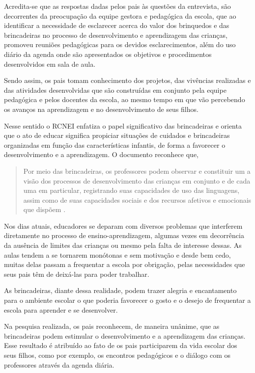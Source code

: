 \begin{refsection}
    Acredita-se que as respostas dadas pelos pais às questões da entrevista, são decorrentes da preocupação da equipe gestora e pedagógica da escola, que ao identificar a necessidade de esclarecer acerca do valor dos brinquedos e das brincadeiras no processo de desenvolvimento e aprendizagem das crianças, promoveu reuniões pedagógicas para os devidos esclarecimentos, além do uso diário da agenda onde são apresentados os objetivos e procedimentos desenvolvidos em sala de aula. 

    Sendo assim, os pais tomam conhecimento dos projetos, das vivências realizadas e das atividades desenvolvidas que são construídas em conjunto pela equipe pedagógica e pelos docentes da escola, ao mesmo tempo em que vão percebendo os avanços na aprendizagem e no desenvolvimento de seus filhos. 

    Nesse sentido o RCNEI \citeyear{RCN2001} enfatiza o papel significativo das brincadeiras e orienta que o ato de educar significa propiciar situações de cuidados e brincadeiras organizadas em função das características infantis, de forma a favorecer o desenvolvimento e a aprendizagem. O documento reconhece que, 

    \begin{quotation}
        Por meio das brincadeiras, os professores podem observar e constituir um a visão dos processos de desenvolvimento das crianças em conjunto e de cada uma em particular, registrando suas capacidades de uso das linguagens, assim como de suas capacidades sociais e dos recursos afetivos e emocionais que dispõem \cite[p.~28]{RCN2001}.
    \end{quotation}

    Nos dias atuais, educadores se deparam com diversos problemas que interferem diretamente no processo de ensino-aprendizagem, algumas vezes em decorrência da ausência de limites das crianças ou mesmo pela falta de interesse dessas. As aulas tendem a se tornarem monótonas e sem motivação e desde bem cedo, muitas delas passam a frequentar a escola por obrigação, pelas necessidades que seus pais têm de deixá-las para poder trabalhar. 

    As brincadeiras, diante dessa realidade, podem trazer alegria e encantamento para o ambiente escolar o que poderia favorecer o gosto e o desejo de frequentar a escola para aprender e se desenvolver. 

    Na pesquisa realizada, os pais reconhecem, de maneira unânime, que as brincadeiras podem estimular o desenvolvimento e a aprendizagem das crianças. Esse resultado é atribuído ao fato de os pais participarem da vida escolar dos seus filhos, como por exemplo, os encontros pedagógicos e o diálogo com os professores através da agenda diária.  


\end{refsection}
